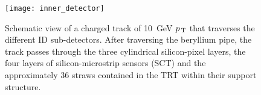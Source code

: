 \begin{figure}[!h]
  \centering
    \texttt{[image: inner\_detector]}
    \caption{Schematic view of a charged track of 10~GeV $p_\mathrm{\, T}$ that traverses
      the different ID sub-detectors. After traversing the beryllium pipe, the
      track passes through the three cylindrical silicon-pixel layers, the four
      layers of silicon-microstrip sensors (SCT) and the approximately 36 straws
      contained in the TRT within their support structure.}
    \label{fig:id}
\end{figure}
